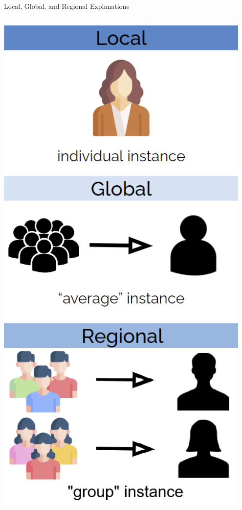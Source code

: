 \documentclass[10pt,compress,t,notes=noshow, xcolor=table]{beamer}
\begin{document}
\begin{frame}{Local, Global, and Regional Explanations}
\begin{columns}[T, totalwidth=\textwidth]
    \begin{column}{0.25\textwidth}
    \centering
    \includegraphics[width=0.95\textwidth]{figure/local_regional_global_col.png}
    
    \end{column}
\end{columns}
\end{frame}
\end{document}
